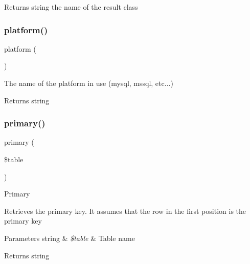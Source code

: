 \begin{DoxyReturn}{Returns}
string the name of the result class 
\end{DoxyReturn}
\mbox{\label{class_c_i___d_b__driver_ad69bddb2ba31b27415484b3da4213ba8}} 
\subsubsection{\texorpdfstring{platform()}{platform()}}
{\footnotesize\ttfamily platform (\begin{DoxyParamCaption}{ }\end{DoxyParamCaption})}

The name of the platform in use (mysql, mssql, etc...)

\begin{DoxyReturn}{Returns}
string 
\end{DoxyReturn}
\mbox{\label{class_c_i___d_b__driver_a68e5f4a4a6fdb79a9a403b045c59b618}} 
\subsubsection{\texorpdfstring{primary()}{primary()}}
{\footnotesize\ttfamily primary (\begin{DoxyParamCaption}\item[{}]{\$table }\end{DoxyParamCaption})}

Primary

Retrieves the primary key. It assumes that the row in the first position is the primary key


\begin{DoxyParams}[1]{Parameters}
string & {\em \$table} & Table name \\
\hline
\end{DoxyParams}
\begin{DoxyReturn}{Returns}
string 
\end{DoxyReturn}
\mbox{\label{class_c_i___d_b__driver_ade8e28ac268bbe2f985c5359bc949f21}} 
